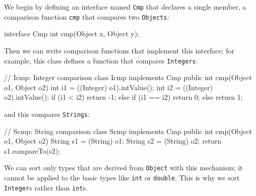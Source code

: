We begin by defining an interface named \verb'Cmp' that declares a single
member, a comparison function \verb'cmp' that compares two \verb'Objects':
\begin{wellcode}
    interface Cmp {
        int cmp(Object x, Object y);
    }
\end{wellcode}
Then we can write comparison functions that implement this interface; for
example, this class defines a function that compares \verb'Integers':
\begin{wellcode}
    // Icmp: Integer comparison
    class Icmp implements Cmp {
        public int cmp(Object o1, Object o2)
        {
            int i1 = ((Integer) o1).intValue();
            int i2 = ((Integer) o2).intValue();
            if (i1 < i2)
                return -1;
            else if (i1 == i2)
                return 0;
            else
                return 1;
        }
    }
\end{wellcode}
and this compares \verb'Strings':
\begin{wellcode}
    // Scmp: String comparison
    class Scmp implements Cmp {
        public int cmp(Object o1, Object o2)
        {
            String s1 = (String) o1;
            String s2 = (String) o2;
            return s1.compareTo(s2);
        }
    }
\end{wellcode}
We can sort only types that are derived from \verb'Object' with this
mechanism; it cannot be applied to the basic types like \verb'int' or
\verb'double'. This is why we sort \verb'Integer's rather than \verb'int's.

